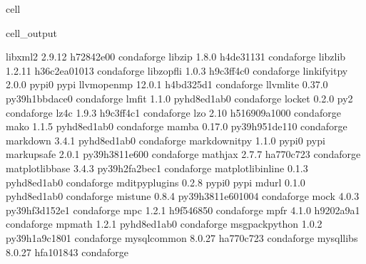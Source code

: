 \documentclass[letterpaper,table,10pt,english]{jupyterBook}
\begin{document}
\begin{sphinxuseclass}{cell}
\begin{sphinxVerbatimOutput}
\begin{sphinxuseclass}{cell_output}
\begin{sphinxVerbatim}[commandchars=\\\{\}]
libxml2                   2.9.12               h72842e0\PYGZus{}0    conda\PYGZhy{}forge
libzip                    1.8.0                h4de3113\PYGZus{}1    conda\PYGZhy{}forge
libzlib                   1.2.11            h36c2ea0\PYGZus{}1013    conda\PYGZhy{}forge
libzopfli                 1.0.3                h9c3ff4c\PYGZus{}0    conda\PYGZhy{}forge
linkify\PYGZhy{}it\PYGZhy{}py             2.0.0                    pypi\PYGZus{}0    pypi
llvm\PYGZhy{}openmp               12.0.1               h4bd325d\PYGZus{}1    conda\PYGZhy{}forge
llvmlite                  0.37.0           py39h1bbdace\PYGZus{}0    conda\PYGZhy{}forge
lmfit                     1.1.0              pyhd8ed1ab\PYGZus{}0    conda\PYGZhy{}forge
locket                    0.2.0                      py\PYGZus{}2    conda\PYGZhy{}forge
lz4\PYGZhy{}c                     1.9.3                h9c3ff4c\PYGZus{}1    conda\PYGZhy{}forge
lzo                       2.10              h516909a\PYGZus{}1000    conda\PYGZhy{}forge
mako                      1.1.5              pyhd8ed1ab\PYGZus{}0    conda\PYGZhy{}forge
mamba                     0.17.0           py39h951de11\PYGZus{}0    conda\PYGZhy{}forge
markdown                  3.4.1              pyhd8ed1ab\PYGZus{}0    conda\PYGZhy{}forge
markdown\PYGZhy{}it\PYGZhy{}py            1.1.0                    pypi\PYGZus{}0    pypi
markupsafe                2.0.1            py39h3811e60\PYGZus{}0    conda\PYGZhy{}forge
mathjax                   2.7.7                ha770c72\PYGZus{}3    conda\PYGZhy{}forge
matplotlib\PYGZhy{}base           3.4.3            py39h2fa2bec\PYGZus{}1    conda\PYGZhy{}forge
matplotlib\PYGZhy{}inline         0.1.3              pyhd8ed1ab\PYGZus{}0    conda\PYGZhy{}forge
mdit\PYGZhy{}py\PYGZhy{}plugins           0.2.8                    pypi\PYGZus{}0    pypi
mdurl                     0.1.0              pyhd8ed1ab\PYGZus{}0    conda\PYGZhy{}forge
mistune                   0.8.4           py39h3811e60\PYGZus{}1004    conda\PYGZhy{}forge
mock                      4.0.3            py39hf3d152e\PYGZus{}1    conda\PYGZhy{}forge
mpc                       1.2.1                h9f54685\PYGZus{}0    conda\PYGZhy{}forge
mpfr                      4.1.0                h9202a9a\PYGZus{}1    conda\PYGZhy{}forge
mpmath                    1.2.1              pyhd8ed1ab\PYGZus{}0    conda\PYGZhy{}forge
msgpack\PYGZhy{}python            1.0.2            py39h1a9c180\PYGZus{}1    conda\PYGZhy{}forge
mysql\PYGZhy{}common              8.0.27               ha770c72\PYGZus{}3    conda\PYGZhy{}forge
mysql\PYGZhy{}libs                8.0.27               hfa10184\PYGZus{}3    conda\PYGZhy{}forge

\end{sphinxVerbatim}
\end{sphinxuseclass}
\end{sphinxVerbatimOutput}
\end{sphinxuseclass}
\end{document}

